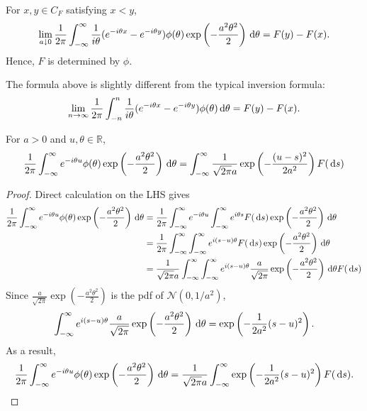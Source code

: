 \begin{theorem}
For $x,y\in C_F$ satisfying $x<y$,
\[
\lim_{a\downarrow 0}\frac{1}{2\pi}\int_{-\infty}^\infty\frac{1}{i\theta}(e^{-i\theta x} - e^{-i\theta y})
\phi(\theta)\exp\left(-\frac{a^2\theta^2}{2}\right)\,\mathrm{d}\theta = F(y) - F(x).
\]
Hence, $F$ is determined by $\phi$.
\end{theorem}
The formula above is slightly different from the typical inversion formula:
\[
\lim_{n\to\infty}\frac{1}{2\pi}\int_{-n}^n\frac{1}{i\theta}(e^{-i\theta x} - e^{-i\theta y})\phi(\theta)\,\mathrm{d}\theta = F(y) - F(x).
\]


\begin{theorem}
For $a>0$ and $u,\theta\in\mathbb{R}$,
\begin{equation}\label{Eq:parseval}
\frac{1}{2\pi}\int_{-\infty}^\infty e^{-i\theta u}\phi(\theta)\exp\left(-\frac{a^2\theta^2}{2}\right)\diff\theta
=
\int_{-\infty}^\infty\frac{1}{\sqrt{2\pi}a}\exp\left(-\frac{(u-s)^2}{2a^2}\right)F(\diff s)
\end{equation}
\end{theorem}
\begin{proof}
Direct calculation on the LHS gives
\begin{align*}
\frac{1}{2\pi}\int_{-\infty}^\infty e^{-i\theta u}\phi(\theta)\exp\left(-\frac{a^2\theta^2}{2}\right)\,\mathrm{d}\theta
&=
\frac{1}{2\pi}\int_{-\infty}^\infty e^{-i\theta u}\int_{-\infty}^\infty e^{i\theta s}F(\,\mathrm{d} s)\exp\left(-\frac{a^2\theta^2}{2}\right)\,\mathrm{d}\theta\\
&=\frac{1}{2\pi}\int_{-\infty}^\infty\int_{-\infty}^\infty e^{i(s-u)\theta}F(\,\mathrm{d} s)\exp\left(-\frac{a^2\theta^2}{2}\right)\,\mathrm{d}\theta\\
&=\frac{1}{\sqrt{2\pi}a}\int_{-\infty}^\infty\int_{-\infty}^\infty e^{i(s-u)\theta}\frac{a}{\sqrt{2\pi}}
\exp\left(-\frac{a^2\theta^2}{2}\right)\,\mathrm{d}\theta F(\,\mathrm{d} s)
\end{align*}
Since $\frac{a}{\sqrt{2\pi}}
\exp\left(-\frac{a^2\theta^2}{2}\right)$ is the pdf of $\mathcal{N}(0,1/a^2)$,
\[
\int_{-\infty}^\infty e^{i(s-u)\theta}\frac{a}{\sqrt{2\pi}}
\exp\left(-\frac{a^2\theta^2}{2}\right)\,\mathrm{d}\theta = \exp\left(-\frac{1}{2a^2}(s-u)^2\right).
\]
As a result,
\[
\frac{1}{2\pi}\int_{-\infty}^\infty e^{-i\theta u}\phi(\theta)\exp\left(-\frac{a^2\theta^2}{2}\right)\,\mathrm{d}\theta
=
\frac{1}{\sqrt{2\pi}a}\int_{-\infty}^\infty\exp\left(-\frac{1}{2a^2}(s-u)^2\right)F(\,\mathrm{d} s).
\]

\end{proof}


